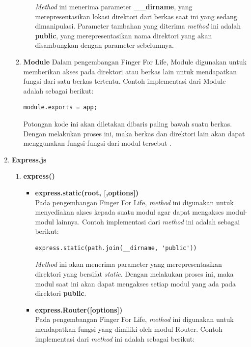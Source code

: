 \begin{enumerate}
\begin{enumerate}
\begin{itemize}
			\textit{Method} ini menerima parameter \textbf{\_\_dirname}, yang merepresentasikan lokasi direktori dari berkas saat ini yang sedang dimanipulasi. Parameter tambahan yang diterima \textit{method} ini adalah \textbf{public}, yang merepresentasikan nama direktori yang akan disambungkan dengan parameter sebelumnya.
		\end{itemize}
		
		
		\item \textbf{Module}
		Dalam pengembangan Finger For Life, Module digunakan untuk memberikan akses pada direktori atau berkas lain untuk mendapatkan fungsi dari satu berkas tertentu. Contoh implementasi dari Module adalah sebagai berikut:
		
\begin{lstlisting}
module.exports = app;
\end{lstlisting}
Potongan kode ini akan diletakan dibaris paling bawah suatu berkas. Dengan melakukan proses ini, maka berkas dan direktori lain akan dapat menggunakan fungsi-fungsi dari modul tersebut .
	\end{enumerate}
	
	\item \textbf{Express.js} \\
	\begin{enumerate}
		\item \textbf{express()}
		\begin{itemize}
			\item \textbf{express.static(root, [,options])} \\
			Pada pengembangan Finger For Life, \textit{method} ini digunakan untuk menyediakan akses kepada suatu modul agar dapat mengakses modul-modul lainnya. Contoh implementasi dari \textit{method} ini adalah sebagai berikut:
\begin{lstlisting}
express.static(path.join(__dirname, 'public'))
\end{lstlisting}
			\textit{Method} ini akan menerima parameter yang merepresentasikan direktori yang bersifat \textit{static}. Dengan melakukan proses ini, maka modul saat ini akan dapat mengakses setiap modul yang ada pada direktori \textbf{public}.
			
			\item \textbf{express.Router([options])} \\
			Pada pengembangan Finger For Life, \textit{method} ini digunakan untuk mendapatkan fungsi yang dimiliki oleh modul Router. Contoh implementasi dari \textit{method} ini adalah sebagai berikut:
			

\end{itemize}
\end{enumerate}
\end{enumerate}
